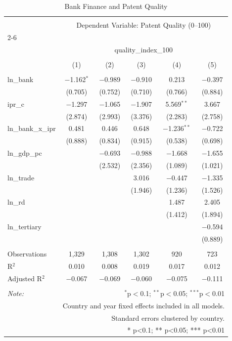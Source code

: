 
\begin{table}[!htbp] \centering 
  \caption{Bank Finance and Patent Quality} 
  \label{} 
\begin{tabular}{@{\extracolsep{5pt}}lccccc} 
\\[-1.8ex]\hline 
\hline \\[-1.8ex] 
 & \multicolumn{5}{c}{Dependent Variable: Patent Quality (0–100)} \\ 
\cline{2-6} 
\\[-1.8ex] & \multicolumn{5}{c}{quality\_index\_100} \\ 
\\[-1.8ex] & (1) & (2) & (3) & (4) & (5)\\ 
\hline \\[-1.8ex] 
 ln\_bank & $-$1.162$^{*}$ & $-$0.989 & $-$0.910 & 0.213 & $-$0.397 \\ 
  & (0.705) & (0.752) & (0.710) & (0.766) & (0.884) \\ 
  ipr\_c & $-$1.297 & $-$1.065 & $-$1.907 & 5.569$^{**}$ & 3.667 \\ 
  & (2.874) & (2.993) & (3.376) & (2.283) & (2.758) \\ 
  ln\_bank\_x\_ipr & 0.481 & 0.446 & 0.648 & $-$1.236$^{**}$ & $-$0.722 \\ 
  & (0.888) & (0.834) & (0.915) & (0.538) & (0.698) \\ 
  ln\_gdp\_pc &  & $-$0.693 & $-$0.988 & $-$1.668 & $-$1.655 \\ 
  &  & (2.532) & (2.356) & (1.089) & (1.021) \\ 
  ln\_trade &  &  & 3.016 & $-$0.447 & $-$1.335 \\ 
  &  &  & (1.946) & (1.236) & (1.526) \\ 
  ln\_rd &  &  &  & 1.487 & 2.405 \\ 
  &  &  &  & (1.412) & (1.894) \\ 
  ln\_tertiary &  &  &  &  & $-$0.594 \\ 
  &  &  &  &  & (0.889) \\ 
 \hline \\[-1.8ex] 
Observations & 1,329 & 1,308 & 1,302 & 920 & 723 \\ 
R$^{2}$ & 0.010 & 0.008 & 0.019 & 0.017 & 0.012 \\ 
Adjusted R$^{2}$ & $-$0.067 & $-$0.069 & $-$0.060 & $-$0.075 & $-$0.111 \\ 
\hline 
\hline \\[-1.8ex] 
\textit{Note:}  & \multicolumn{5}{r}{$^{*}$p$<$0.1; $^{**}$p$<$0.05; $^{***}$p$<$0.01} \\ 
 & \multicolumn{5}{r}{Country and year fixed effects included in all models.} \\ 
 & \multicolumn{5}{r}{Standard errors clustered by country.} \\ 
 & \multicolumn{5}{r}{* p<0.1; ** p<0.05; *** p<0.01} \\ 
\end{tabular} 
\end{table} 
